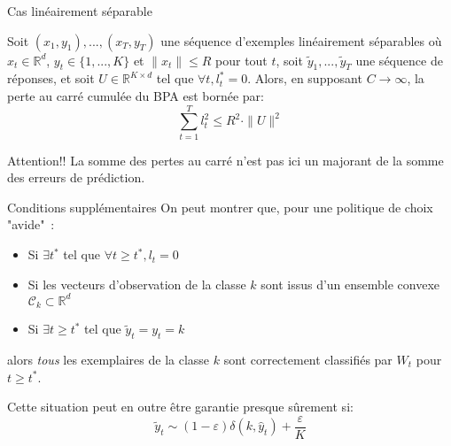 \documentclass{beamer}
\begin{document}
\begin{frame}{Cas linéairement séparable}
	\begin{theorem}
		\label{theo:BPAT1}
		Soit $(x_1,y_1),...,(x_T,y_T)$ une séquence d'exemples linéairement séparables où $x_t \in \mathbb{R}^d$, $y_t\in \{1,...,K\}$ et $\parallel x_t \parallel\leqslant R$ pour tout $t$, soit $\tilde{y}_1,...,\tilde{y}_T$ une séquence de réponses, et soit $U \in \mathbb{R}^{K\times d}$ tel que $ \forall t, l^*_t=0$. Alors, en supposant $C \rightarrow \infty$, la perte au carré cumulée du BPA est bornée par:
		\begin{equation*}
		\sum_{t=1}^{T} l_t^2 \leqslant R^2\cdot \parallel{U}\parallel^2
		\end{equation*}
	\end{theorem}
	
	\begin{alertblock}{Attention!!}
		La somme des pertes au carré n'est pas ici un majorant de la somme des erreurs de prédiction.
	\end{alertblock}
\end{frame}

\begin{frame}{Conditions supplémentaires}
	On peut montrer que, pour une politique de choix "avide"~:
	\begin{itemize}
		\item Si $\exists t^*$ tel que $\forall t \geq t^*, l_t =0$
		\item Si les vecteurs d'observation  de la classe $k$ sont issus d'un ensemble convexe $\mathcal{C}_k \subset \mathbb{R}^d$
		\item Si $\exists t \geq t^*$ tel que $\tilde{y}_t = y_t = k$
	\end{itemize}
	alors \textit{tous} les exemplaires de la classe $k$ sont correctement classifiés par $W_t$ pour $t \geq t^*$.
	
	Cette situation peut en outre être garantie presque sûrement si: 
	$$\tilde{y}_t \sim (1-\varepsilon) \delta(k,\hat{y}_t) + \frac{\varepsilon}{K} $$
\end{frame}
\end{document}
